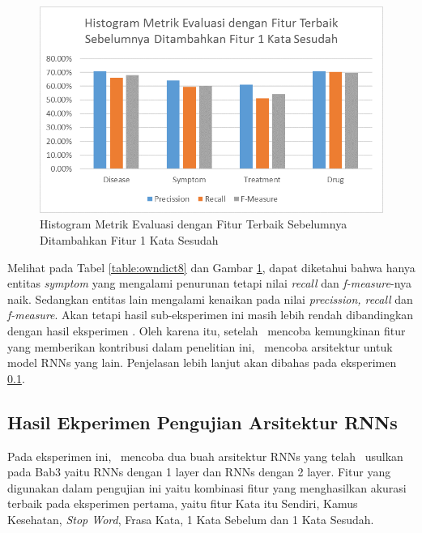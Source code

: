 	\begin{figure}
		\centering
		\includegraphics[width=0.85\linewidth]{images/histogram8}
		\caption{Histogram Metrik Evaluasi dengan Fitur Terbaik Sebelumnya Ditambahkan Fitur 1 Kata Sesudah}
		\label{fig:owndict8}
	\end{figure}
	
	Melihat pada Tabel \ref{table:owndict8} dan Gambar \ref{fig:owndict8}, dapat diketahui bahwa hanya entitas \textit{symptom} yang mengalami penurunan tetapi nilai \textit{recall} dan \textit{f-measure}-nya naik. Sedangkan entitas lain mengalami kenaikan pada nilai \textit{precission, recall} dan \textit{f-measure}. Akan tetapi hasil sub-eksperimen ini masih lebih rendah dibandingkan dengan hasil eksperimen \cite{skripsiKakRadit}. Oleh karena itu, setelah \saya~mencoba kemungkinan fitur yang memberikan kontribusi dalam penelitian ini, \penulis~mencoba arsitektur untuk model RNNs yang lain. Penjelasan lebih lanjut akan dibahas pada eksperimen \ref{eks:eks2}.
	
	
	
  
  
    \subsection{Hasil Ekperimen Pengujian Arsitektur RNNs}\label{eks:eks2}
    
    Pada eksperimen ini, \saya~mencoba dua buah arsitektur RNNs yang telah \saya~usulkan pada Bab3 yaitu RNNs dengan 1 layer dan RNNs dengan 2 layer. Fitur yang digunakan dalam pengujian ini yaitu kombinasi fitur yang menghasilkan akurasi terbaik pada eksperimen pertama, yaitu fitur Kata itu Sendiri, Kamus Kesehatan, \textit{Stop Word}, Frasa Kata, 1 Kata Sebelum dan 1 Kata Sesudah.
    
